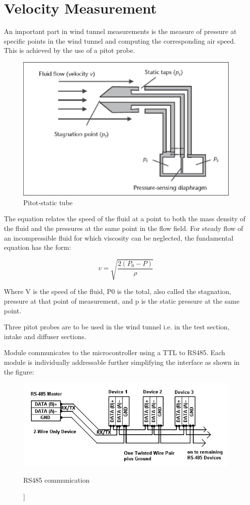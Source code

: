 \section{Velocity Measurement}
An important part in wind tunnel measurements is the measure of pressure at specific points in the wind tunnel and computing the corresponding air speed. This is achieved by the use of a pitot probe. 
\begin{center}
\begin{figure}
\centering
\includegraphics[width=0.6\linewidth]{Figures/pitot}
\caption[Pitot-static tube]{Pitot-static tube \cite{noauthor_wind_nodate}}
\end{figure}
\end{center}
The equation relates the speed of the fluid at a point to both the mass density of the fluid and the pressures at the same point in the flow field. For steady flow of an incompressible fluid for which viscosity can be neglected, the fundamental equation has the form:

$$ v = \sqrt{\frac{2(P_{0} - P)}{\rho}}$$

Where V is the speed of the fluid, P0 is the total, also called the stagnation, pressure at that point of measurement, and p is the static pressure at the same point.

Three pitot probes are to be used in the wind tunnel i.e. in the test section, intake and diffuser sections.

Module communicates to the microcontroller using a TTL to RS485. Each module is individually addressable further simplifying the interface as shown in the figure:
\begin{center}
\begin{figure}
\centering
\includegraphics{Figures/modbus}
\caption[RS485 communication]]{RS485 communication}
\end{figure}
\end{center}

